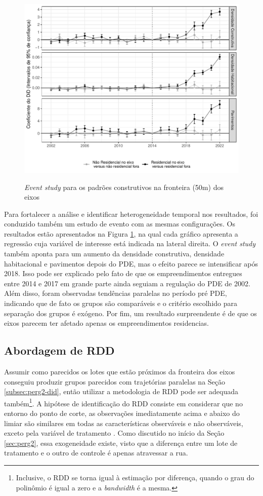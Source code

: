 \begin{figure}[h]
    \centering
    \caption{\textit{Event study} para os padrões construtivos na fronteira (50m) dos eixos}
    \includegraphics[width = .9\textwidth]{figuras/event-study.pdf}
    \label{fig:event-study}
\end{figure}

Para fortalecer a análise e identificar heterogeneidade temporal nos resultados, foi conduzido também um estudo de evento com as mesmas configurações. Os resultados estão apresentados na Figura \ref{fig:event-study}, na qual cada gráfico apresenta a regressão cuja variável de interesse está indicada na lateral direita. O \textit{event study} também aponta para um aumento da densidade construtiva, densidade habitacional e pavimentos depois do PDE, mas o efeito parece se intensificar após 2018. Isso pode ser explicado pelo fato de que os empreendimentos entregues entre 2014 e 2017 em grande parte ainda seguiam a regulação do PDE de 2002. Além disso, foram observadas tendências paralelas no período pré PDE, indicando que de fato os grupos são comparáveis e o critério escolhido para separação dos grupos é exógeno. Por fim, um resultado surpreendente é de que os eixos parecem ter afetado apenas os empreendimentos residencias.

\subsection{Abordagem de RDD}

Assumir como parecidos os lotes que estão próximos da fronteira dos eixos conseguiu produzir grupos parecidos com trajetórias paralelas na Seção \ref{subsec:perg2-did}, então utilizar a metodologia de RDD pode ser adequada também\footnote{Inclusive, o RDD se torna igual à estimação por diferença, quando o grau do polinômio é igual a zero e a \textit{bandwidth} é a mesma.}. A hipótese de identificação do RDD consiste em considerar que no entorno do ponto de corte, as observações imediatamente acima e abaixo do limiar são similares em todas as características observáveis e não observáveis, exceto pela variável de tratamento \cite{Cattaneo2019, Cattaneo2024}. Como discutido no início da Seção \ref{sec:perg2}, essa exogeneidade existe, visto que a diferença entre um lote de tratamento e o outro de controle é apenas atravessar a rua.

